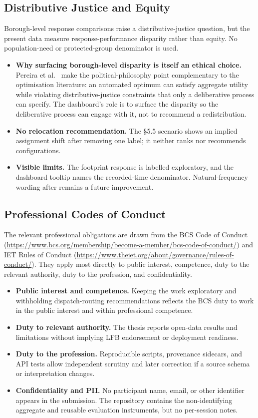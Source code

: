 \subsection{Distributive Justice and Equity}

Borough-level response comparisons raise a distributive-justice question, but the present data measure response-performance disparity rather than equity. No population-need or protected-group denominator is used.

\begin{itemize}
    \item \textbf{Why surfacing borough-level disparity is itself an ethical choice.} Pereira et al.\ \cite{pereira2017equity} make the political-philosophy point complementary to the optimisation literature: an automated optimum can satisfy aggregate utility while violating distributive-justice constraints that only a deliberative process can specify. The dashboard's role is to surface the disparity so the deliberative process can engage with it, not to recommend a redistribution.
    \item \textbf{No relocation recommendation.} The §5.5 scenario shows an implied assignment shift after removing one label; it neither ranks nor recommends configurations.
    \item \textbf{Visible limits.} The footprint response is labelled exploratory, and the dashboard tooltip names the recorded-time denominator. Natural-frequency wording after \cite{padilla2018} remains a future improvement.
\end{itemize}

\subsection{Professional Codes of Conduct}

The relevant professional obligations are drawn from the BCS Code of Conduct (\url{https://www.bcs.org/membership/become-a-member/bcs-code-of-conduct/}) and IET Rules of Conduct (\url{https://www.theiet.org/about/governance/rules-of-conduct/}). They apply most directly to public interest, competence, duty to the relevant authority, duty to the profession, and confidentiality.

\begin{itemize}
    \item \textbf{Public interest and competence.} Keeping the work exploratory and withholding dispatch-routing recommendations reflects the BCS duty to work in the public interest and within professional competence.
    \item \textbf{Duty to relevant authority.} The thesis reports open-data results and limitations without implying LFB endorsement or deployment readiness.
    \item \textbf{Duty to the profession.} Reproducible scripts, provenance sidecars, and API tests allow independent scrutiny and later correction if a source schema or interpretation changes.
    \item \textbf{Confidentiality and PII.} No participant name, email, or other identifier appears in the submission. The repository contains the non-identifying aggregate and reusable evaluation instruments, but no per-session notes.
\end{itemize}
